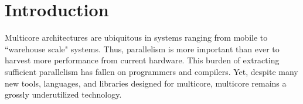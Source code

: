 \section{Introduction}






Multicore architectures are ubiquitous in systems ranging from mobile to
``warehouse scale" systems. Thus, parallelism is more important than ever to
harvest more performance from current hardware.  This burden of extracting
sufficient parallelism has fallen on programmers and compilers. Yet, despite
many new tools, languages, and libraries designed for multicore, multicore
remains a grossly underutilized technology.


